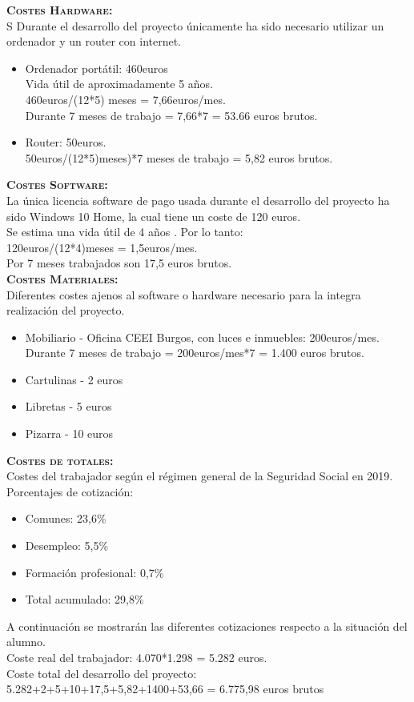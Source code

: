 \textbf{\textsc{Costes Hardware:}}\\S
Durante el desarrollo del proyecto únicamente ha sido necesario utilizar un ordenador y un router con internet.
\begin{itemize}
\item Ordenador portátil: 460euros \\Vida útil de aproximadamente 5 años.\\460euros/(12*5) meses = 7,66euros/mes.\\Durante 7 meses de trabajo = 7,66*7 = 53.66 euros brutos.
\item Router: 50euros. \\ 50euros/(12*5)meses)*7 meses de trabajo = 5,82 euros brutos.
\end{itemize}


\textbf{\textsc{Costes Software:}}\\
La única licencia software de pago usada durante el desarrollo del proyecto ha sido Windows 10 Home, la cual tiene un coste de 120 euros.\\
Se estima una vida útil de 4 años \cite{vidautil}. Por lo tanto:\\
120euros/(12*4)meses = 1,5euros/mes.\\
Por 7 meses trabajados son 17,5 euros brutos.\\

\textbf{\textsc{Costes Materiales:}}\\
Diferentes costes ajenos al software o hardware necesario para la integra realización del proyecto.
\begin{itemize}
\item Mobiliario - Oficina CEEI Burgos, con luces e inmuebles: 200euros/mes.\\
Durante 7 meses de trabajo = 200euros/mes*7 = 1.400 euros brutos.\\
\item Cartulinas - 2 euros
\item Libretas - 5 euros
\item Pizarra - 10 euros
\end{itemize}

\textbf{\textsc{Costes de totales:}}\\
Costes del trabajador según el régimen general de la Seguridad Social en 2019. \cite{ssocial} \\
Porcentajes de cotización:
\begin{itemize}
\item Comunes: 23,6\%
\item Desempleo: 5,5\%
\item Formación profesional: 0,7\%
\item Total acumulado: 29,8\%
\end{itemize}
A continuación se mostrarán las diferentes cotizaciones respecto a la situación del alumno.\\
Coste real del trabajador: 4.070*1.298 =  5.282 euros.\\
Coste total del desarrollo del proyecto:\\
5.282+2+5+10+17,5+5,82+1400+53,66 = 6.775,98 euros brutos\\

